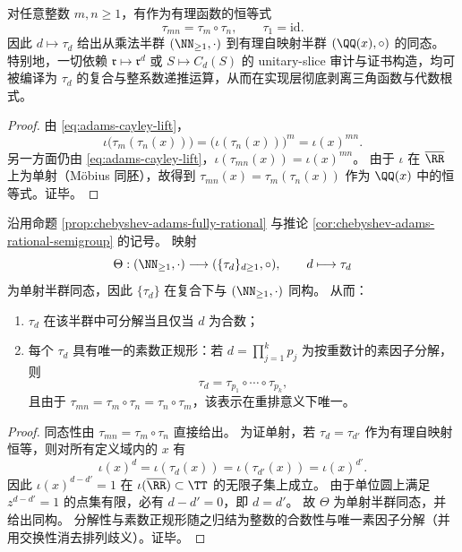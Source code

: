 \begin{corollary}[Chebyshev--Adams 的有理半群表示：\texorpdfstring{$\tau_{mn}=\tau_m\circ\tau_n$}{tau_mn=tau_m∘tau_n}]\label{cor:chebyshev-adams-rational-semigroup}
对任意整数 \(m,n\ge 1\)，有作为有理函数的恒等式
\[
\tau_{mn}=\tau_m\circ\tau_n,
\qquad
\tau_1=\mathrm{id}.
\]
因此 \(d\mapsto\tau_d\) 给出从乘法半群 \((\NN_{\ge 1},\cdot)\) 到有理自映射半群 \((\QQ(x),\circ)\) 的同态。
特别地，一切依赖 \(\mathfrak r\mapsto \mathfrak r^d\) 或 \(S\mapsto C_d(S)\) 的 unitary-slice 审计与证书构造，均可被编译为 \(\tau_d\) 的复合与整系数递推运算，从而在实现层彻底剥离三角函数与代数根式。
\end{corollary}
\begin{proof}
由 \eqref{eq:adams-cayley-lift}，
\[
\iota\!\bigl(\tau_m(\tau_n(x))\bigr)
=\bigl(\iota(\tau_n(x))\bigr)^m
=\iota(x)^{mn}.
\]
另一方面仍由 \eqref{eq:adams-cayley-lift}，\(\iota(\tau_{mn}(x))=\iota(x)^{mn}\)。
由于 \(\iota\) 在 \(\overline{\RR}\) 上为单射（M\"obius 同胚），故得到 \(\tau_{mn}(x)=\tau_m(\tau_n(x))\) 作为 \(\QQ(x)\) 中的恒等式。证毕。
\end{proof}

\begin{theorem}\label{thm:unitary-slice-tau-prime-normal-form}
沿用命题 \ref{prop:chebyshev-adams-fully-rational} 与推论 \ref{cor:chebyshev-adams-rational-semigroup} 的记号。
映射
\[
\Theta:(\NN_{\ge 1},\cdot)\longrightarrow (\{\tau_d\}_{d\ge 1},\circ),
\qquad d\longmapsto \tau_d
\]
为单射半群同态，因此 \(\{\tau_d\}\) 在复合下与 \((\NN_{\ge 1},\cdot)\) 同构。
从而：
\begin{enumerate}
  \item \(\tau_d\) 在该半群中可分解当且仅当 \(d\) 为合数；
  \item 每个 \(\tau_d\) 具有唯一的素数正规形：若 \(d=\prod_{j=1}^{k}p_j\) 为按重数计的素因子分解，则
  \[
  \tau_d=\tau_{p_1}\circ\cdots\circ \tau_{p_k},
  \]
  且由于 \(\tau_{mn}=\tau_m\circ\tau_n=\tau_n\circ\tau_m\)，该表示在重排意义下唯一。
\end{enumerate}
\end{theorem}
\begin{proof}
同态性由 \(\tau_{mn}=\tau_m\circ\tau_n\) 直接给出。
为证单射，若 \(\tau_d=\tau_{d'}\) 作为有理自映射恒等，则对所有定义域内的 \(x\) 有
\[
\iota(x)^d=\iota(\tau_d(x))=\iota(\tau_{d'}(x))=\iota(x)^{d'}.
\]
因此 \(\iota(x)^{d-d'}=1\) 在 \(\iota(\overline{\RR})\subset\TT\) 的无限子集上成立。
由于单位圆上满足 \(z^{d-d'}=1\) 的点集有限，必有 \(d-d'=0\)，即 \(d=d'\)。
故 \(\Theta\) 为单射半群同态，并给出同构。
分解性与素数正规形随之归结为整数的合数性与唯一素因子分解（并用交换性消去排列歧义）。证毕。
\end{proof}

